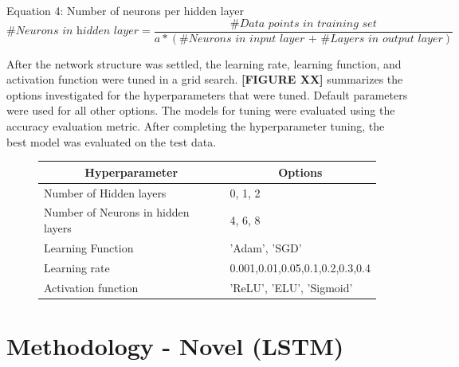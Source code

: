 \documentclass{article}
\begin{document}
\begin{center}
Equation 4: Number of neurons per hidden layer 
    \[ \textit{\# Neurons in hidden layer} = \frac{\textit{\# Data points in training set}}{a*(\textit{\# Neurons in input layer + \# Layers in output layer})} \]
\end{center}

After the network structure was settled, the learning rate, learning function, and activation function were tuned in a grid search. \textbf{[FIGURE XX]} summarizes the options investigated for the hyperparameters that were tuned. Default parameters were used for all other options. The models for tuning were evaluated using the accuracy evaluation metric. After completing the hyperparameter tuning, the best model was evaluated on the test data. 

\begin{figure}[!htb]
\caption{FFNN Hyperparameter Tuning Space}
\begin{table}[H]
\centering
\begin{tabular}{|l|l|}
\hline
\multicolumn{1}{|c|}{\textbf{Hyperparameter}} & \multicolumn{1}{c|}{\textbf{Options}} \\ \hline
Number of Hidden layers            & 0, 1, 2                         \\ \hline
Number of Neurons in hidden layers & 4, 6, 8                         \\ \hline
Learning Function                  & 'Adam', 'SGD'                   \\ \hline
Learning rate                      & 0.001,0.01,0.05,0.1,0.2,0.3,0.4 \\ \hline
Activation function                & 'ReLU', 'ELU', 'Sigmoid'        \\ \hline
\end{tabular}
\end{table}
\end{figure}

\section*{Methodology - Novel (LSTM)}
\end{document}
